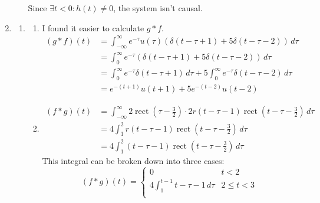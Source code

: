 \documentclass[12pt]{article}
\newcommand{\rect}{\operatorname{rect}}
\begin{document}
\begin{enumerate}
\begin{enumerate}
                        Since $\exists t < 0: h(t) \ne 0$, the system isn't causal.
            \end{enumerate}
      \item \begin{enumerate}
                  \item \begin{enumerate}
                              \item I found it easier to calculate $g * f$.
                                    \begin{align*}
                                          (g * f)(t)
                                           & = \int_{-\infty}^{\infty} e^{-\tau}u(\tau)(\delta(t-\tau+1)+5\delta(t-\tau-2))\,d\tau                      \\
                                           & = \int_{0}^{\infty} e^{-\tau}(\delta(t-\tau+1)+5\delta(t-\tau-2))\,d\tau                                   \\
                                           & = \int_{0}^{\infty} e^{-\tau}\delta(t-\tau+1)\,d\tau + 5\int_{0}^{\infty} e^{-\tau}\delta(t-\tau-2)\,d\tau \\
                                           & = \boxed{e^{-(t+1)}u(t+1)+5e^{-(t-2)}u(t-2)}
                                    \end{align*}
                              \item \begin{align*}
                                          (f * g)(t)
                                           & = \int_{-\infty}^{\infty} 2\rect \left(\tau-\frac{3}{2}\right) \cdot 2r(t-\tau-1)\rect\left(t-\tau-\frac{3}{2}\right)\,d\tau \\
                                           & = 4\int_{1}^{2} r(t-\tau-1)\rect\left(t-\tau-\frac{3}{2}\right)\,d\tau                                                       \\
                                           & = 4\int_{1}^{2} (t-\tau-1)\rect\left(t-\tau-\frac{3}{2}\right)\,d\tau
                                    \end{align*}
                                    This integral can be broken down into three cases:
                                    \[(f * g)(t)=\begin{cases}
                                                0                               & t < 2       \\
                                                4\int_{1}^{t-1} t-\tau-1\,d\tau & 2 \le t < 3 \\

\end{cases}\]
\end{enumerate}
\end{enumerate}
\end{enumerate}
\end{document}
